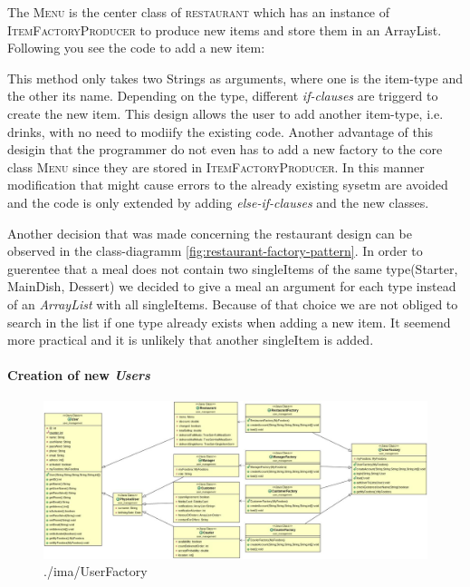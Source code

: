 The \textsc{Menu} is the center class of \textsc{restaurant} which has an instance of 
\textsc{ItemFactoryProducer} to produce new items and store them in an ArrayList. Following you
see the code to add a new item:


This method only takes two Strings as arguments, where one is the item-type and the other its
name. Depending on the type, different \textit{if-clauses} are triggerd to create the new item.
This design allows the user to add another item-type, i.e. drinks, with no need to modiify the
existing code. Another advantage of this desigin that the programmer do not even has to add a new
factory to the core class \textsc{Menu} since they are stored in \textsc{ItemFactoryProducer}. In
this manner modification that might cause errors to the already existing sysetm are avoided and
the code is only extended by adding \textit{else-if-clauses} and the new classes. 

Another decision that was made concerning the restaurant design can be observed in the
class-diagramm \ref{fig:restaurant-factory-pattern}. In order to guerentee that a meal does not
contain two singleItems of the same type(Starter, MainDish, Dessert) we decided to give a meal an
argument for each type instead of an \textit{ArrayList} with all singleItems. Because of that
choice we are not obliged to search in the list if one type already exists when adding a new item.
It seemend more practical and it is unlikely that another singleItem is added.

\paragraph{Creation of new \textit{Users}}

\begin{figure}[H]
	\centering
	\includegraphics[width=1\linewidth]{./ima/userFactory.jpg}
	\caption{./ima/UserFactory}
	\label{fig:./ima/userFactory}
\end{figure}

